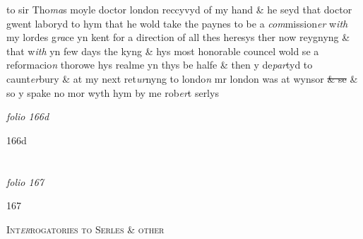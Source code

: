 \documentclass[12pt, a4paper]{book}
\begin{document}
				\marginpar[\vspace{0.5cm}{\textcolor{Gray}{moyle}}]{}
			
 		
		\ifthenelse{\isodd{\thepage}}
		{\reversemarginpar}
		{\normalmarginpar}
		to sir Tho\textit{ma}s moyle doctor london reccyvyd of my hand \& he seyd that doctor gwent laboryd to hym
			 that he wold take the paynes to be a \textit{com}mission\textit{er} w\textit{ith} my lordes g\textit{ra}ce yn kent for a direction of all thes heresys ther now reygnyng \& that w\textit{ith} yn few days the kyng \& hys most honorable councel wold se a reformacio\textit{n} thorowe hys realme yn thys be halfe \& then y de\textit{par}tyd to caunt\textit{er}bury \& at my next ret\textit{ur}nyng to londo\textit{n} mr london was at wynsor \sout{\& se} \& so y spake no mor wyth hym by me rob\textit{er}t serlys
 	

\dotfill
						\newpage
{}

\textit{folio 166d}


 	\begin{flushright}{\color{Gray}166d}\end{flushright}

\dotfill
						\newpage {} \section*{}  \subsection*{}

\textit{folio 167}



            		\begin{flushright}{\color{Mahogany}167}\end{flushright}
            		
				\begin{center} \begin{large} {\scshape Int\textit{er}rogatories to Serles \& other} \end{large} \end{center}
			
            		
			
            		
				\marginpar[\vspace{0.5cm}{\textcolor{Gray}{1}}]{}
			
\end{document}

